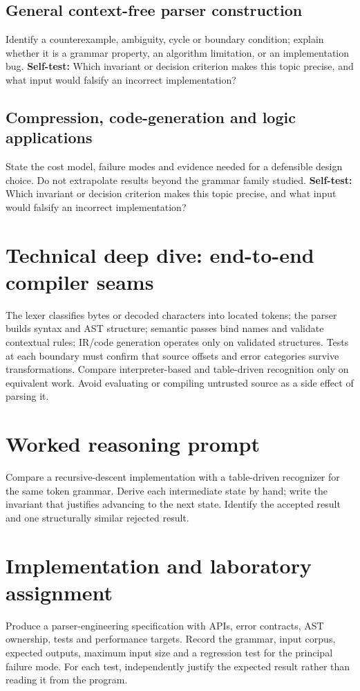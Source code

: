 \documentclass[11pt,letterpaper]{article}
\begin{document}
\subsection{General context-free parser construction}
Identify a counterexample, ambiguity, cycle or boundary condition; explain whether it is a grammar property, an algorithm limitation, or an implementation bug.
\textbf{Self-test:} Which invariant or decision criterion makes this topic precise, and what input would falsify an incorrect implementation?
\subsection{Compression, code-generation and logic applications}
State the cost model, failure modes and evidence needed for a defensible design choice. Do not extrapolate results beyond the grammar family studied.
\textbf{Self-test:} Which invariant or decision criterion makes this topic precise, and what input would falsify an incorrect implementation?
\section{Technical deep dive: end-to-end compiler seams}
The lexer classifies bytes or decoded characters into located tokens; the parser builds syntax and AST structure; semantic passes bind names and validate contextual rules; IR/code generation operates only on validated structures. Tests at each boundary must confirm that source offsets and error categories survive transformations. Compare interpreter-based and table-driven recognition only on equivalent work. Avoid evaluating or compiling untrusted source as a side effect of parsing it.
\section{Worked reasoning prompt}
Compare a recursive-descent implementation with a table-driven recognizer for the same token grammar. Derive each intermediate state by hand; write the invariant that justifies advancing to the next state. Identify the accepted result and one structurally similar rejected result.
\section{Implementation and laboratory assignment}
Produce a parser-engineering specification with APIs, error contracts, AST ownership, tests and performance targets. Record the grammar, input corpus, expected outputs, maximum input size and a regression test for the principal failure mode. For each test, independently justify the expected result rather than reading it from the program.
\end{document}

